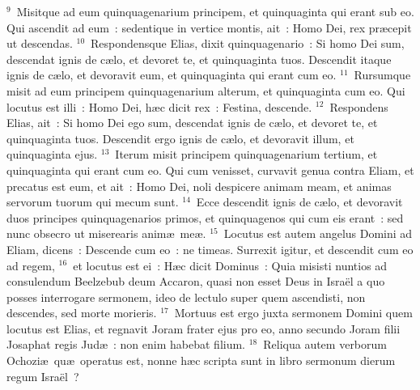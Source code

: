 ${}^{9}$~Misitque ad eum quinquagenarium principem, et quinquaginta qui erant sub eo. Qui ascendit ad eum~: sedentique in vertice montis, ait~: Homo Dei, rex pr\ae cepit ut descendas.
${}^{10}$~Respondensque Elias, dixit quinquagenario~: Si homo Dei sum, descendat ignis de c\ae lo, et devoret te, et quinquaginta tuos. Descendit itaque ignis de c\ae lo, et devoravit eum, et quinquaginta qui erant cum eo.
${}^{11}$~Rursumque misit ad eum principem quinquagenarium alterum, et quinquaginta cum eo. Qui locutus est illi~: Homo Dei, h\ae c dicit rex~: Festina, descende.
${}^{12}$~Respondens Elias, ait~: Si homo Dei ego sum, descendat ignis de c\ae lo, et devoret te, et quinquaginta tuos. Descendit ergo ignis de c\ae lo, et devoravit illum, et quinquaginta ejus.
${}^{13}$~Iterum misit principem quinquagenarium tertium, et quinquaginta qui erant cum eo. Qui cum venisset, curvavit genua contra Eliam, et precatus est eum, et ait~: Homo Dei, noli despicere animam meam, et animas servorum tuorum qui mecum sunt.
${}^{14}$~Ecce descendit ignis de c\ae lo, et devoravit duos principes quinquagenarios primos, et quinquagenos qui cum eis erant~: sed nunc obsecro ut miserearis anim\ae\ me\ae .
${}^{15}$~Locutus est autem angelus Domini ad Eliam, dicens~: Descende cum eo~: ne timeas. Surrexit igitur, et descendit cum eo ad regem,
${}^{16}$~et locutus est ei~: H\ae c dicit Dominus~: Quia misisti nuntios ad consulendum Beelzebub deum Accaron, quasi non esset Deus in Isra\"el a quo posses interrogare sermonem, ideo de lectulo super quem ascendisti, non descendes, sed morte morieris.
${}^{17}$~Mortuus est ergo juxta sermonem Domini quem locutus est Elias, et regnavit Joram frater ejus pro eo, anno secundo Joram filii Josaphat regis Jud\ae~: non enim habebat filium.
${}^{18}$~Reliqua autem verborum Ochozi\ae\ qu\ae\ operatus est, nonne h\ae c scripta sunt in libro sermonum dierum regum Isra\"el~?

